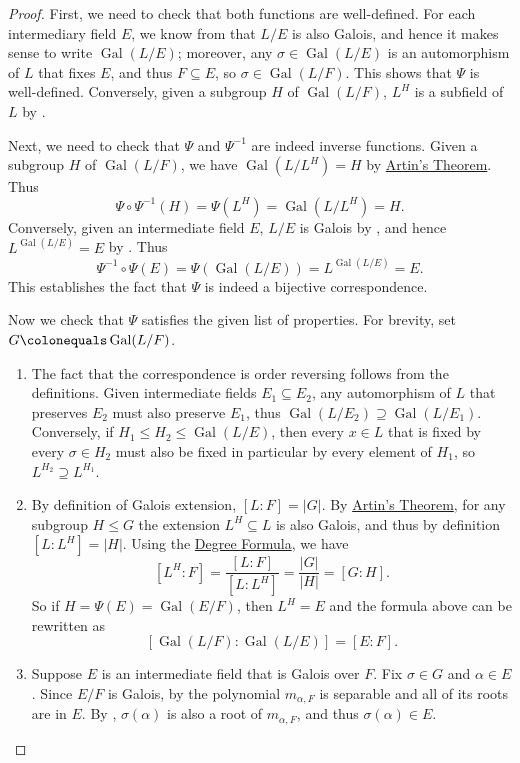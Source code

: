 \documentclass[12pt]{report}
\numberwithin{equation}{section}
\numberwithin{theorem}{chapter}
\theoremstyle{definition}
\newtheorem*{basic properties}{Basic Properties}
\newtheorem*{Important Remark}{Important Remark}
\DeclareMathOperator{\Gal}{Gal}
\begin{document}
\begin{proof}
First, we need to check that both functions are well-defined. For each intermediary field $E$, we know from  that $L/E$ is also Galois, and hence it makes sense to write $\Gal(L/E)$; moreover, any $\sigma \in \Gal(L/E)$ is an automorphism of $L$ that fixes $E$, and thus $F \subseteq E$, so $\sigma \in \Gal(L/F)$. This shows that $\Psi$ is well-defined. Conversely, given a subgroup $H$ of $\Gal(L/F)$, $L^H$ is a subfield of $L$ by .


Next, we need to check that $\Psi$ and $\Psi^{-1}$ are indeed inverse functions. Given a subgroup $H$ of $\Gal(L/F)$, we have $\Gal(L/L^H) = H$ by \hyperref[Artin's theorem]{Artin's Theorem}. Thus
$$\Psi \circ \Psi^{-1}(H) = \Psi(L^H) = \Gal(L/L^H) = H.$$
Conversely, given an intermediate field $E$, $L/E$ is Galois by , and hence $L^{\Gal(L/E)} = E$ by . Thus
$$\Psi^{-1} \circ \Psi(E) = \Psi(\Gal(L/E)) = L^{\Gal(L/E)} = E.$$
This establishes the fact that $\Psi$ is indeed a bijective correspondence.


Now we check that $\Psi$ satisfies the given list of properties. For brevity, set $G \colonequals \Gal(L/F)$.

\begin{enumerate}[leftmargin=20pt,label=(\alph*)]
\item The fact that the correspondence is order reversing follows from the definitions. Given intermediate fields $E_1 \subseteq E_2$, any automorphism of $L$ that preserves $E_2$ must also preserve $E_1$, thus $\Gal(L/E_2) \supseteq \Gal(L/E_1)$. Conversely, if $H_1 \leq H_2 \leq \Gal(L/E)$, then every $x \in L$ that is fixed by every $\sigma \in H_2$ must also be fixed in particular by every element of $H_1$, so $L^{H_2} \supseteq L^{H_1}$.

\item By definition of Galois extension, $[L:F] = |G|$. By \hyperref[Artin's theorem]{Artin's Theorem}, for any subgroup $H \leq G$ the extension $L^H \subseteq L$ is also Galois, and thus by definition $[L:L^H] = |H|$. Using the \hyperref[deg formula]{Degree Formula}, we have
$$[L^H:F] = \frac{[L:F]}{[L:L^H]} = \frac{|G|}{|H|} = [G:H].$$
So if $H = \Psi(E) = \Gal(E/F)$, then $L^H = E$ and the formula above can be rewritten as
$$[\Gal(L/F) : \Gal(L/E)] = [E:F].$$

\item Suppose $E$ is an intermediate field that is Galois over $F$. Fix $\sigma \in G$ and $\alpha \in E$. Since $E/F$ is Galois, by  the polynomial $m_{\alpha,F}$ is separable and all of its roots are in $E$. By , $\sigma(\alpha)$ is also a root of $m_{\alpha,F}$, and thus $\sigma(\alpha) \in E$. 
 

\end{enumerate}
\end{proof}
\end{document}
